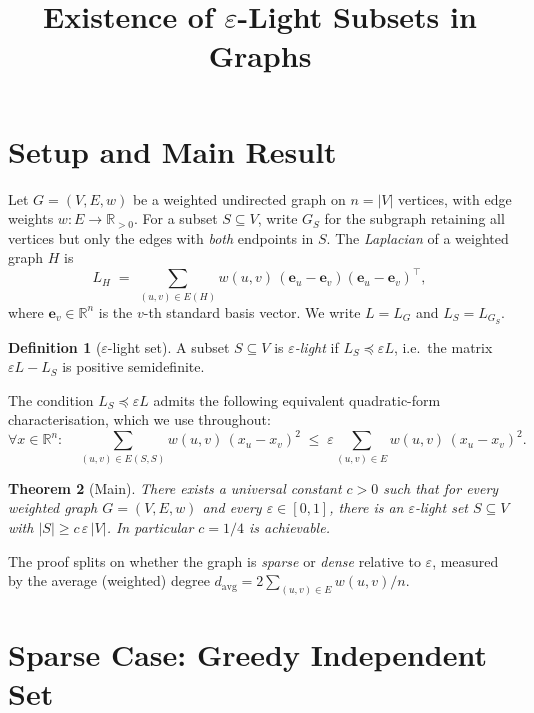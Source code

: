 \documentclass[12pt]{article}
\title{Existence of $\varepsilon$-Light Subsets in Graphs}
\author{}
\date{}
\newtheorem{theorem}{Theorem}
\theoremstyle{definition}
\newtheorem{definition}[theorem]{Definition}
\theoremstyle{remark}
\begin{document}
\maketitle

\section{Setup and Main Result}

Let $G = (V, E, w)$ be a weighted undirected graph on $n = |V|$ vertices, with
edge weights $w : E \to \mathbb{R}_{>0}$.  For a subset $S \subseteq V$, write
$G_S$ for the subgraph retaining all vertices but only the edges with \emph{both}
endpoints in $S$.  The \emph{Laplacian} of a weighted graph $H$ is
\[
  L_H \;=\; \sum_{(u,v)\in E(H)} w(u,v)\,(\mathbf{e}_u - \mathbf{e}_v)(\mathbf{e}_u - \mathbf{e}_v)^\top,
\]
where $\mathbf{e}_v \in \mathbb{R}^n$ is the $v$-th standard basis vector.  We
write $L = L_G$ and $L_S = L_{G_S}$.

\begin{definition}[$\varepsilon$-light set]
A subset $S \subseteq V$ is \emph{$\varepsilon$-light} if
$L_S \preceq \varepsilon L$, i.e.\ the matrix $\varepsilon L - L_S$ is
positive semidefinite.
\end{definition}

The condition $L_S \preceq \varepsilon L$ admits the following equivalent
quadratic-form characterisation, which we use throughout:
\begin{equation}\label{eq:quad}
  \forall x \in \mathbb{R}^n:\quad
  \sum_{(u,v)\in E(S,S)} w(u,v)\,(x_u-x_v)^2
  \;\le\;
  \varepsilon\sum_{(u,v)\in E} w(u,v)\,(x_u-x_v)^2.
\end{equation}

\begin{theorem}[Main]\label{thm:main}
There exists a universal constant $c > 0$ such that for every weighted graph
$G=(V,E,w)$ and every $\varepsilon\in[0,1]$, there is an $\varepsilon$-light set
$S\subseteq V$ with $|S|\ge c\,\varepsilon\,|V|$.  In particular $c = 1/4$
is achievable.
\end{theorem}

The proof splits on whether the graph is \emph{sparse} or \emph{dense} relative
to $\varepsilon$, measured by the average (weighted) degree
$d_{\mathrm{avg}} = 2\sum_{(u,v)\in E}w(u,v)/n$.

\section{Sparse Case: Greedy Independent Set}
\end{document}
